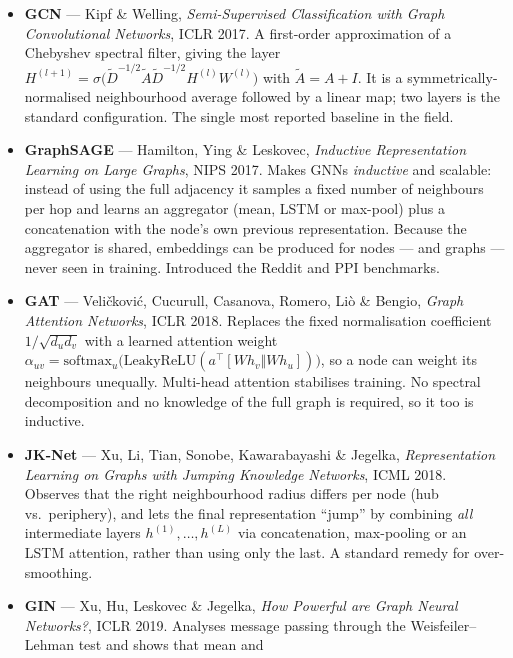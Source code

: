 \begin{itemize}[label=$\bullet$,leftmargin=1.3em]
  \item \textbf{GCN} --- Kipf \& Welling, \emph{Semi-Supervised Classification with Graph
        Convolutional Networks}, ICLR 2017.
        A first-order approximation of a Chebyshev spectral filter, giving the layer
        $H^{(l+1)} = \sigma\bigl(\tilde{D}^{-1/2}\tilde{A}\tilde{D}^{-1/2}H^{(l)}W^{(l)}\bigr)$
        with $\tilde{A}=A+I$. It is a symmetrically-normalised neighbourhood average
        followed by a linear map; two layers is the standard configuration. The single most
        reported baseline in the field.
  \item \textbf{GraphSAGE} --- Hamilton, Ying \& Leskovec, \emph{Inductive Representation
        Learning on Large Graphs}, NIPS 2017.
        Makes GNNs \emph{inductive} and scalable: instead of using the full adjacency it
        samples a fixed number of neighbours per hop and learns an aggregator (mean, LSTM
        or max-pool) plus a concatenation with the node's own previous representation.
        Because the aggregator is shared, embeddings can be produced for nodes --- and
        graphs --- never seen in training. Introduced the Reddit and PPI benchmarks.
  \item \textbf{GAT} --- Veli\v{c}kovi\'{c}, Cucurull, Casanova, Romero, Li\`{o} \& Bengio,
        \emph{Graph Attention Networks}, ICLR 2018.
        Replaces the fixed normalisation coefficient $1/\sqrt{d_ud_v}$ with a learned
        attention weight $\alpha_{uv}=\mathrm{softmax}_u\bigl(\mathrm{LeakyReLU}(a^{\!\top}
        [Wh_v \Vert Wh_u])\bigr)$, so a node can weight its neighbours unequally. Multi-head
        attention stabilises training. No spectral decomposition and no knowledge of the
        full graph is required, so it too is inductive.
  \item \textbf{JK-Net} --- Xu, Li, Tian, Sonobe, Kawarabayashi \& Jegelka,
        \emph{Representation Learning on Graphs with Jumping Knowledge Networks}, ICML 2018.
        Observes that the right neighbourhood radius differs per node (hub vs.\ periphery),
        and lets the final representation ``jump'' by combining \emph{all} intermediate
        layers $h^{(1)},\dots,h^{(L)}$ via concatenation, max-pooling or an LSTM attention,
        rather than using only the last. A standard remedy for over-smoothing.
  \item \textbf{GIN} --- Xu, Hu, Leskovec \& Jegelka, \emph{How Powerful are Graph Neural
        Networks?}, ICLR 2019.
        Analyses message passing through the Weisfeiler--Lehman test and shows that mean and

\end{itemize}
